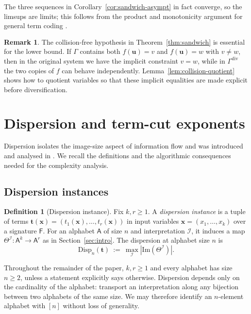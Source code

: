 \documentclass[11pt]{article}
\newcommand{\textcite}[1]{\citet{#1}}
\newcommand{\parencite}[1]{\citep{#1}}
\theoremstyle{definition}
\newtheorem{definition}{Definition}[section]
\newtheorem{remark}{Remark}[section]
\theoremstyle{plain}
\newcommand{\A}{\mathsf{A}}
\newcommand{\Fun}{\mathsf{F}}
\newcommand{\Img}{\mathrm{Im}}
\newcommand{\Disp}{\mathrm{Disp}}
\begin{document}
The three sequences in Corollary~\ref{cor:sandwich-asympt} in fact converge, so the limsups are limits;
this follows from the product and monotonicity argument for general term coding
\parencite{riis2026termcoding}.

\begin{remark}
The collision-free hypothesis in Theorem~\ref{thm:sandwich} is essential for the lower bound.
If $\Gamma$ contains both $f(\mathbf u)=v$ and $f(\mathbf u)=w$ with $v\ne w$, then in the original system we
have the implicit constraint $v=w$, while in $\Gamma^{\mathrm{div}}$ the two copies of $f$ can behave
independently.
Lemma~\ref{lem:collision-quotient} shows how to quotient variables so that these implicit equalities are made
explicit before diversification.
\end{remark}


\section{Dispersion and term-cut exponents}
\label{sec:dispersion}

Dispersion isolates the image-size aspect of information flow and was introduced and analysed in
\textcite{riis2019max}.  We recall the definitions and the algorithmic consequences needed for the complexity analysis.

\subsection{Dispersion instances}
\begin{definition}[Dispersion instance]
\label{def:dispersion-multisorted}
Fix $k,r\ge 1$.
A \emph{dispersion instance} is a tuple of terms
$\mathbf t(\mathbf x)=(t_1(\mathbf x),\dots,t_r(\mathbf x))$ in input variables
$\mathbf x=(x_1,\dots,x_k)$ over a signature $\Fun$.
For an alphabet $\A$ of size $n$ and interpretation $\mathcal I$, it induces a map
$\Theta^\mathcal I:\A^k\to \A^r$ as in Section~\ref{sec:intro}.
The dispersion at alphabet size $n$ is
\[
\Disp_n(\mathbf t)\ :=\ \max_{\mathcal I} |\Img(\Theta^\mathcal I)|.
\]
\end{definition}

Throughout the remainder of the paper, $k,r\ge 1$ and every alphabet has size $n\ge 2$, unless a statement
explicitly says otherwise.  Dispersion depends only on the cardinality of the alphabet: transport an
interpretation along any bijection between two alphabets of the same size.  We may therefore identify an
$n$-element alphabet with $[n]$ without loss of generality.
\end{document}
